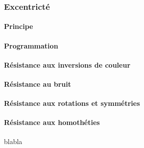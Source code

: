 \documentclass{article}
\begin{document}
      \subsubsection{Excentricté}
      
	\paragraph{Principe}
      
	\paragraph{Programmation}
	
	\paragraph{Résistance aux inversions de couleur}
	
	\paragraph{Résistance au bruit}
	
	\paragraph{Résistance aux rotations et symmétries}
      
	\paragraph{Résistance aux homothéties} blabla
	
\end{document}

